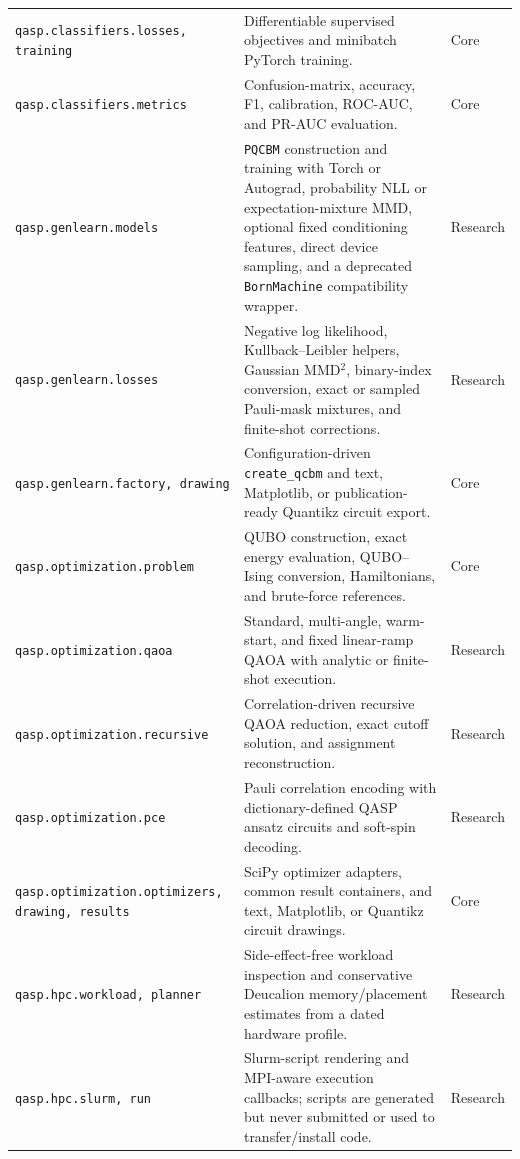 \documentclass[10pt]{article}
\newcommand{\code}[1]{\texttt{#1}}
\begin{document}
\begin{table}[p]
\begin{tabularx}{\textwidth}{@{}p{}X>{\raggedright\arraybackslash}p{}@{}}
\code{qasp.classifiers.}\linebreak\code{losses, training} & Differentiable supervised objectives and minibatch PyTorch training. & Core \\
\code{qasp.classifiers.metrics} & Confusion-matrix, accuracy, F1, calibration, ROC-AUC, and PR-AUC evaluation. & Core \\
\code{qasp.genlearn.models} & \code{PQCBM} construction and training with Torch or Autograd, probability NLL or expectation-mixture MMD, optional fixed conditioning features, direct device sampling, and a deprecated \code{BornMachine} compatibility wrapper. & Research \\
\code{qasp.genlearn.losses} & Negative log likelihood, Kullback--Leibler helpers, Gaussian MMD$^2$, binary-index conversion, exact or sampled Pauli-mask mixtures, and finite-shot corrections. & Research \\
\code{qasp.genlearn.}\linebreak\code{factory, drawing} & Configuration-driven \code{create\_qcbm} and text, Matplotlib, or publication-ready Quantikz circuit export. & Core \\
\code{qasp.optimization.problem} & QUBO construction, exact energy evaluation, QUBO--Ising conversion, Hamiltonians, and brute-force references. & Core \\
\code{qasp.optimization.qaoa} & Standard, multi-angle, warm-start, and fixed linear-ramp QAOA with analytic or finite-shot execution. & Research \\
\code{qasp.optimization.recursive} & Correlation-driven recursive QAOA reduction, exact cutoff solution, and assignment reconstruction. & Research \\
\code{qasp.optimization.pce} & Pauli correlation encoding with dictionary-defined QASP ansatz circuits and soft-spin decoding. & Research \\
\code{qasp.optimization.}\linebreak\code{optimizers, drawing, results} & SciPy optimizer adapters, common result containers, and text, Matplotlib, or Quantikz circuit drawings. & Core \\
\code{qasp.hpc.workload, planner} & Side-effect-free workload inspection and conservative Deucalion memory/placement estimates from a dated hardware profile. & Research \\
\code{qasp.hpc.slurm, run} & Slurm-script rendering and MPI-aware execution callbacks; scripts are generated but never submitted or used to transfer/install code. & Research \\
\bottomrule
\end{tabularx}
\end{table}
\end{document}
